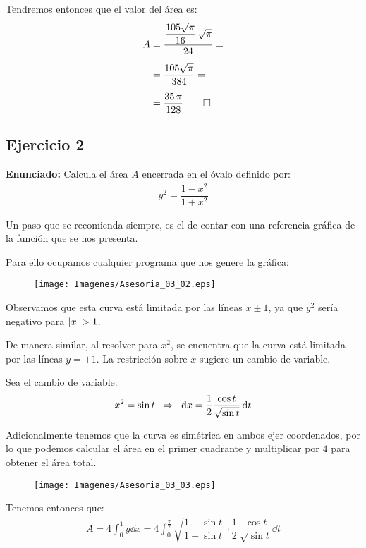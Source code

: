 Tendremos entonces que el valor del área es:
\begin{align*}
A &= \dfrac{\dfrac{105 \sqrt{\pi}}{16} \, \sqrt{\pi}}{24} = \\[0.5em]
&= \dfrac{105 \sqrt{\pi}}{384} = \\[0.5em]
&= \dfrac{35 \, \pi}{128} \qed
\end{align*}

\subsection{Ejercicio 2}

\textbf{Enunciado: } Calcula el área $A$ encerrada en el óvalo definido por:
\begin{align*}
y^{2} = \dfrac{1 - x^{2}}{1 + x^{2}}
\end{align*}

Un paso que se recomienda siempre, es el de contar con una referencia gráfica de la función que se nos presenta.
\par
Para ello ocupamos cualquier programa que nos genere la gráfica:
\begin{figure}[H]
    \centering
    \texttt{[image: Imagenes/Asesoria\_03\_02.eps]}
\end{figure}

Observamos que esta curva está limitada por las líneas $x \pm 1$, ya que $y^{2}$ sería negativo para $\abs{x} > 1$.
\par
De manera similar, al resolver para $x^{2}$, se encuentra que la curva está limitada por las líneas $y = \pm 1$. La restricción sobre $x$ sugiere un cambio de variable.
\par
Sea el cambio de variable:
\begin{align*}
x^{2} = \sin t \hspace{0.2cm} \Rightarrow \hspace{0.2cm} \dd{x} = \dfrac{1}{2} \dfrac{\cos t}{\sqrt{\sin t}} \dd{t}
\end{align*}

Adicionalmente tenemos que la curva es simétrica en ambos ejer coordenados, por lo que podemos calcular el área en el primer cuadrante y multiplicar por $4$ para obtener el área total.

\begin{figure}[H]
    \centering
    \texttt{[image: Imagenes/Asesoria\_03\_03.eps]}
\end{figure}

Tenemos entonces que:
\begin{align*}
A = 4 \int_{0}^{1} y \dd{x} =  4 \int_{0}^{\frac{\pi}{2}} \sqrt{{\dfrac{1 - \sin t}{1 + \sin t}}} \, \cdot \dfrac{1}{2} \, \dfrac{\cos t}{\sqrt{\sin t}} \dd{t}
\end{align*}

